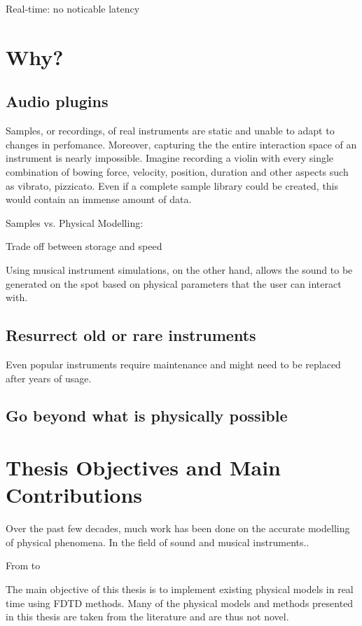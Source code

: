 Real-time: no noticable latency

\section{Why?}
\subsection{Audio plugins} 
Samples, or recordings, of real instruments are static and unable to adapt to changes in perfomance. Moreover, capturing the the entire interaction space of an instrument is nearly impossible. Imagine recording a violin with every single combination of bowing force, velocity, position, duration and other aspects such as vibrato, pizzicato. Even if a complete sample library could be created, this would contain an immense amount of data.

Samples vs. Physical Modelling:

Trade off between storage and speed

Using musical instrument simulations, on the other hand, allows the sound to be generated on the spot based on physical parameters that the user can interact with. 

\subsection{Resurrect old or rare instruments}

Even popular instruments require maintenance and might need to be replaced after years of usage. 


\subsection{Go beyond what is physically possible} 


\section{Thesis Objectives and Main Contributions}
Over the past few decades, much work has been done on the accurate modelling of physical phenomena. In the field of sound and musical instruments.. 

From \cite{Fletcher1998} to \cite{Bilbao2019CMJb}



The main objective of this thesis is to implement existing physical models in real time using FDTD methods. Many of the physical models and methods presented in this thesis are taken from the literature and are thus not novel. 

